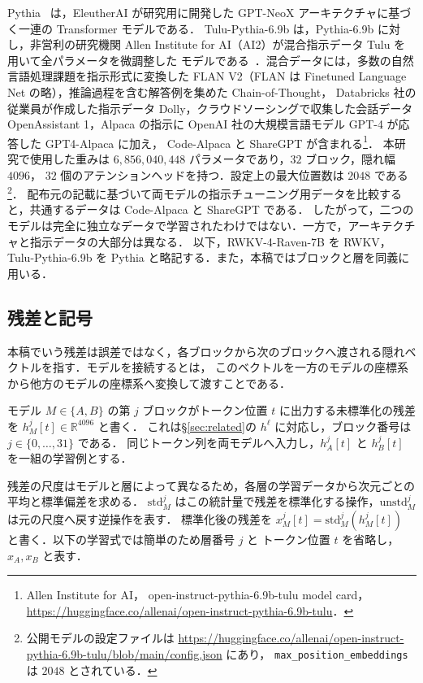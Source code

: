\documentclass[techrep,noauthor]{ipsj}
\newcommand{\rev}[1]{{\color{blue}#1}}
\newcommand{\revr}[1]{{\color{red}#1}}
\begin{document}
Pythia~\cite{3618408.3618510} は，EleutherAI が研究用に開発した GPT-NeoX アーキテクチャに基づく一連の Transformer モデルである．
Tulu-Pythia-6.9b は，Pythia-6.9b に対し，非営利の研究機関 Allen Institute for AI（AI2）が混合指示データ Tulu を用いて全パラメータを微調整した
モデルである~\cite{3666122.3669390}．混合データには，多数の自然言語処理課題を指示形式に変換した FLAN V2\rev{（FLAN は Finetuned Language Net の略）}，推論過程を含む解答例を集めた Chain-of-Thought，
Databricks 社の従業員が作成した指示データ Dolly，クラウドソーシングで収集した会話データ OpenAssistant 1，Alpaca の指示に\rev{ OpenAI 社の大規模言語モデル} GPT-4 が応答した GPT4-Alpaca に加え，
Code-Alpaca と ShareGPT が含まれる\footnote{Allen Institute for AI，
open-instruct-pythia-6.9b-tulu model card，
\url{https://huggingface.co/allenai/open-instruct-pythia-6.9b-tulu}．}．
本研究で使用した重みは $6{,}856{,}040{,}448$ パラメータであり，$32$ ブロック，隠れ幅 $4096$，
$32$ 個の\rev{アテンションヘッド}を持つ．設定上の最大位置数は $2048$ である\footnote{公開モデルの設定ファイルは
\url{https://huggingface.co/allenai/open-instruct-pythia-6.9b-tulu/blob/main/config.json} にあり，
\texttt{max\_position\_embeddings} は $2048$ とされている．}．
配布元の記載に基づいて両モデルの指示チューニング用データを比較すると，共通するデータは Code-Alpaca と ShareGPT である．
したがって，二つのモデルは完全に独立なデータで学習されたわけではない．一方で，アーキテクチャと指示データの大部分は異なる．
\revr{以下，RWKV-4-Raven-7B を RWKV，Tulu-Pythia-6.9b を Pythia と略記する．また，本稿ではブロックと層を同義に用いる．}

\subsection{\revr{残差と記号}}\label{sec:notation}
本稿でいう残差は誤差ではなく，各ブロックから次のブロックへ渡される隠れベクトルを指す．モデルを接続するとは，
このベクトルを一方のモデルの座標系から他方のモデルの座標系へ変換して渡すことである．
\revr{モデル $M\in\{A,B\}$ の第 $j$ ブロックがトークン位置 $t$ に出力する未標準化の残差を $h_M^j[t]\in\mathbb R^{4096}$ と書く．
これは\S\ref{sec:related}の $h^{\ell}$ に対応し，ブロック番号は $j\in\{0,\ldots,31\}$ である．
同じトークン列を両モデルへ入力し，$h_A^j[t]$ と $h_B^j[t]$ を一組の学習例とする．

残差の尺度はモデルと層によって異なるため，各層の学習データから次元ごとの平均と標準偏差を求める．
$\mathrm{std}_M^j$ はこの統計量で残差を標準化する操作，$\mathrm{unstd}_M^j$ は元の尺度へ戻す逆操作を表す．
標準化後の残差を $x_M^j[t]=\mathrm{std}_M^j(h_M^j[t])$ と書く．以下の学習式では簡単のため層番号 $j$ と
トークン位置 $t$ を省略し，$x_A,x_B$ と表す．}
\end{document}
